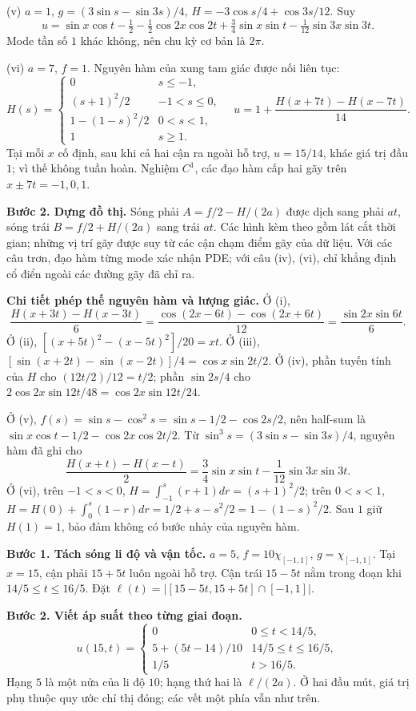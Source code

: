 (v) $a=1$, $g=(3\sin s-\sin3s)/4$, $H=-3\cos s/4+\cos3s/12$. Suy
\[u=\sin x\cos t-\tfrac12-\tfrac12\cos2x\cos2t+\tfrac34\sin x\sin t-\tfrac1{12}\sin3x\sin3t.\]
Mode tần số $1$ khác không, nên chu kỳ cơ bản là $2\pi$.

(vi) $a=7$, $f=1$. Nguyên hàm của xung tam giác được nối liên tục:
\[H(s)=\begin{cases}0&s\le-1,\\(s+1)^2/2&-1<s\le0,\\1-(1-s)^2/2&0<s<1,\\1&s\ge1.\end{cases}\quad
u=1+\frac{H(x+7t)-H(x-7t)}{14}.\]
Tại mỗi $x$ cố định, sau khi cả hai cận ra ngoài hỗ trợ, $u=15/14$, khác giá trị đầu $1$; vì thế không tuần hoàn. Nghiệm $C^1$, các đạo hàm cấp hai gãy trên $x\pm7t=-1,0,1$.

\textbf{Bước 2. Dựng đồ thị.} Sóng phải $A=f/2-H/(2a)$ được dịch sang phải $at$, sóng trái $B=f/2+H/(2a)$ sang trái $at$. Các hình kèm theo gồm lát cắt thời gian; những vị trí gãy được suy từ các cận chạm điểm gãy của dữ liệu. Với các câu trơn, đạo hàm từng mode xác nhận PDE; với câu (iv), (vi), chỉ khẳng định cổ điển ngoài các đường gãy đã chỉ ra.

\textbf{Chi tiết phép thế nguyên hàm và lượng giác.} Ở (i),
\[\frac{H(x+3t)-H(x-3t)}6
=\frac{\cos(2x-6t)-\cos(2x+6t)}{12}
=\frac{\sin2x\sin6t}{6}.\]
Ở (ii), $[(x+5t)^2-(x-5t)^2]/20=xt$. Ở (iii), $[\sin(x+2t)-\sin(x-2t)]/4=\cos x\sin2t/2$. Ở (iv), phần tuyến tính của $H$ cho $(12t/2)/12=t/2$; phần $\sin2s/4$ cho $2\cos2x\sin12t/48=\cos2x\sin12t/24$.

Ở (v), $f(s)=\sin s-\cos^2s=\sin s-1/2-\cos2s/2$, nên half-sum là $\sin x\cos t-1/2-\cos2x\cos2t/2$. Từ $\sin^3s=(3\sin s-\sin3s)/4$, nguyên hàm đã ghi cho
\[\frac{H(x+t)-H(x-t)}2=\frac34\sin x\sin t-\frac1{12}\sin3x\sin3t.\]
Ở (vi), trên $-1<s<0$, $H=\int_{-1}^s(r+1)dr=(s+1)^2/2$; trên $0<s<1$, $H=H(0)+\int_0^s(1-r)dr=1/2+s-s^2/2=1-(1-s)^2/2$. Sau $1$ giữ $H(1)=1$, bảo đảm không có bước nhảy của nguyên hàm.

\textbf{Bước 1. Tách sóng li độ và vận tốc.} $a=5$, $f=10\chi_{[-1,1]}$, $g=\chi_{[-1,1]}$. Tại $x=15$, cận phải $15+5t$ luôn ngoài hỗ trợ. Cận trái $15-5t$ nằm trong đoạn khi $14/5\le t\le16/5$. Đặt $\ell(t)=|[15-5t,15+5t]\cap[-1,1]|$.

\textbf{Bước 2. Viết áp suất theo từng giai đoạn.}
\[u(15,t)=\begin{cases}0&0\le t<14/5,\\5+(5t-14)/10&14/5\le t\le16/5,\\1/5&t>16/5.\end{cases}\]
Hạng $5$ là một nửa của li độ $10$; hạng thứ hai là $\ell/(2a)$. Ở hai đầu mút, giá trị phụ thuộc quy ước chỉ thị đóng; các vết một phía vẫn như trên.

